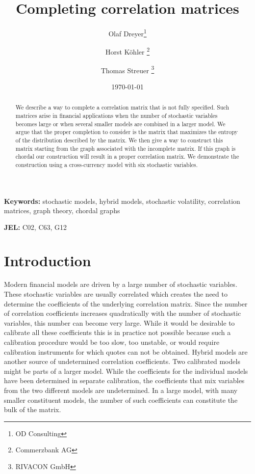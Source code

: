 \documentclass[11pt, a4paper]{article}
\begin{document}
\title{Completing correlation matrices}

\author{Olaf Dreyer\thanks{OD Consulting}
\and Horst K\"ohler \thanks{Commerzbank AG}
\and Thomas Streuer \thanks{RIVACON GmbH} }

\date{\today}

\maketitle

\begin{abstract}
	We describe a way to complete a correlation matrix that is not fully specified. Such matrices arise in financial applications when the number of stochastic variables becomes large or when several smaller models are combined in a larger model. We argue that the proper completion to consider is the matrix that maximizes the entropy of the distribution described by the matrix. We then give a way to construct this matrix starting from the graph associated with the incomplete matrix. If this graph is chordal our construction will result in a proper correlation matrix. We demonstrate the construction using a cross-currency model with six stochastic variables.  
\end{abstract}

\textbf{Keywords:} stochastic models, hybrid models, stochastic volatility, correlation matrices, graph theory, chordal graphs

\textbf{JEL:} C02, C63, G12

\section{Introduction}
Modern financial models are driven by a large number of stochastic variables. These stochastic variables are usually correlated which creates the need to determine the coefficients of the underlying correlation matrix. Since the number of correlation coefficients increases quadratically with the number of stochastic variables, this number can become very large. While it would be desirable to calibrate all these coefficients this is in practice not possible because such a calibration procedure would be too slow, too unstable, or would require calibration instruments for which quotes can not be obtained. Hybrid models are another source of undetermined correlation coefficients. Two calibrated models might be parts of a larger model. While the coefficients for the individual models have been determined in separate calibration, the coefficients that mix variables from the two different models are undetermined. In a large model, with many smaller constituent models, the number of such coefficients can constitute the bulk of the matrix. 
\end{document}
